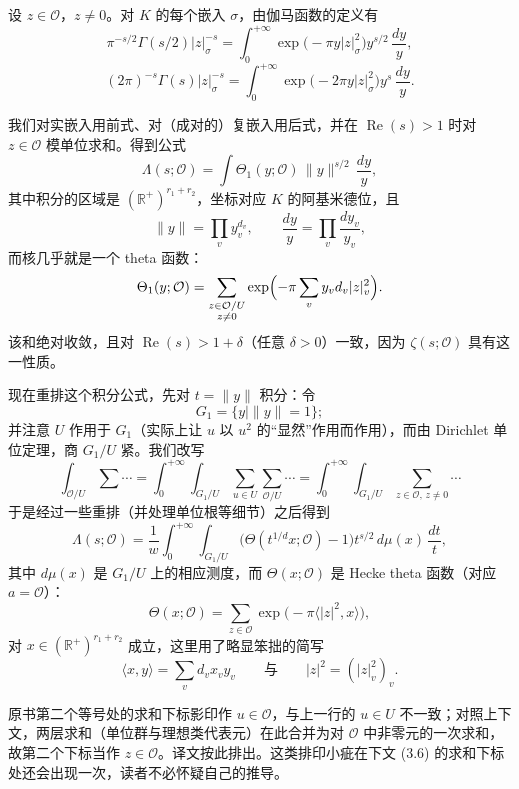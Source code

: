 设 $z\in\mathcal{O}$，$z\neq0$。对 $K$ 的每个嵌入 $\sigma$，由伽马函数的定义有
\[
\pi^{-s/2}\Gamma(s/2)|z|_\sigma^{-s}=\int_0^{+\infty}\exp\bigl(-\pi y|z|_\sigma^2\bigr)y^{s/2}\,\frac{dy}{y},
\]
\[
(2\pi)^{-s}\Gamma(s)|z|_\sigma^{-s}=\int_0^{+\infty}\exp\bigl(-2\pi y|z|_\sigma^2\bigr)y^{s}\,\frac{dy}{y}.
\]

我们对实嵌入用前式、对（成对的）复嵌入用后式，并在 $\operatorname{Re}(s)>1$ 时对 $z\in\mathcal{O}$ 模单位求和。得到公式
\begin{equation}\tag{2.3}\label{c2:eq:2.3}
\Lambda(s;\mathcal{O})=\int\Theta_1(y;\mathcal{O})\,\|y\|^{s/2}\,\frac{dy}{y},
\end{equation}
其中积分的区域是 $(\mathbb{R}^+)^{r_1+r_2}$，坐标对应 $K$ 的阿基米德位，且
\[
\|y\|=\prod_v y_v^{d_v},\qquad \frac{dy}{y}=\prod_v\frac{dy_v}{y_v},
\]
而核几乎就是一个 theta 函数：
\[
\Theta_1(y;\mathcal{O})=\sum_{\substack{z\in\mathcal{O}/U\\ z\neq0}}\exp\Bigl(-\pi\sum_v y_vd_v|z|_v^2\Bigr).
\]
该和绝对收敛，且对 $\operatorname{Re}(s)>1+\delta$（任意 $\delta>0$）一致，因为 $\zeta(s;\mathcal{O})$ 具有这一性质。

现在重排这个积分公式，先对 $t=\|y\|$ 积分：令
\[
G_1=\{y\mid \|y\|=1\};
\]
并注意 $U$ 作用于 $G_1$（实际上让 $u$ 以 $u^2$ 的“显然”作用而作用），而由 Dirichlet 单位定理，商 $G_1/U$ 紧。我们改写
\[
\int_{\mathcal{O}/U}\sum\cdots=\int_0^{+\infty}\int_{G_1/U}\sum_{u\in U}\sum_{\mathcal{O}/U}\cdots=\int_0^{+\infty}\int_{G_1/U}\sum_{z\in\mathcal{O},\,z\neq0}\cdots
\]
于是经过一些重排（并处理单位根等细节）之后得到
\[
\Lambda(s;\mathcal{O})=\frac{1}{w}\int_0^{+\infty}\int_{G_1/U}\bigl(\Theta(t^{1/d}x;\mathcal{O})-1\bigr)t^{s/2}\,d\mu(x)\,\frac{dt}{t},
\]
其中 $d\mu(x)$ 是 $G_1/U$ 上的相应测度，而 $\Theta(x;\mathcal{O})$ 是 Hecke theta 函数（对应 $a=\mathcal{O}$）：
\begin{equation}\tag{2.4}\label{c2:eq:2.4}
\Theta(x;\mathcal{O})=\sum_{z\in\mathcal{O}}\exp\bigl(-\pi\langle |z|^2,x\rangle\bigr),
\end{equation}
对 $x\in(\mathbb{R}^+)^{r_1+r_2}$ 成立，这里用了略显笨拙的简写
\[
\langle x,y\rangle=\sum_v d_vx_vy_v\qquad\text{与}\qquad |z|^2=(|z|_v^2)_v.
\]

\begin{annote}
原书第二个等号处的求和下标影印作 $u\in\mathcal{O}$，与上一行的 $u\in U$ 不一致；对照上下文，两层求和（单位群与理想类代表元）在此合并为对 $\mathcal{O}$ 中非零元的一次求和，故第二个下标当作 $z\in\mathcal{O}$。译文按此排出。这类排印小疵在下文 (3.6) 的求和下标处还会出现一次，读者不必怀疑自己的推导。
\par\vspace{0.15em}{\raggedleft 【来源：原书 p.23 影印逐字核对（A）；本书对明显排印小疵的处理体例（I）】\par}
\end{annote}


